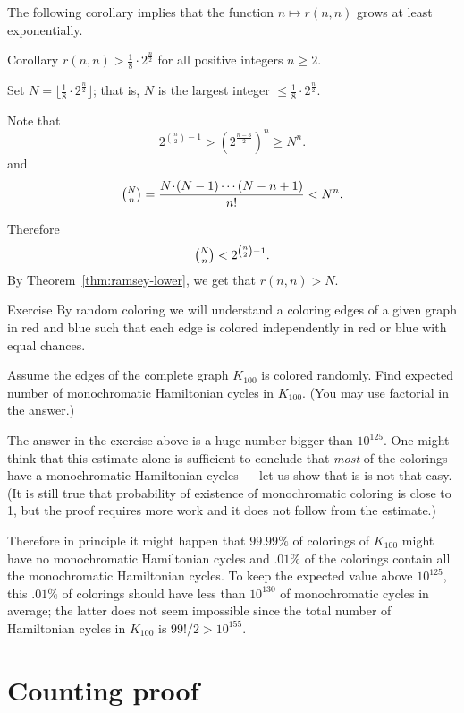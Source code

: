The following corollary implies that the function $n\mapsto r(n,n)$ grows at least exponentially. 

\begin{thm}{Corollary}
$r(n, n)> \tfrac1{8}\cdot 2^{\frac{n}{2}}$
for all positive integers $n\ge 2$.
\end{thm}

Set $N=\lfloor\tfrac1{8}\cdot 2^{\frac{n}{2}}\rfloor$;
that is, $N$ is the largest integer $\le\tfrac1{8}\cdot 2^{\frac{n}{2}}$.

Note that 
\[2^{\binom n 2 - 1}> (2^{\frac{n-3}2})^n\ge N^n.\]
and
\[\tbinom N n=\frac{N\cdot(N-1)\cdots (N-n+1)}{n!}<  N^n.\]

Therefore  
\[\tbinom N n<2^{\binom n 2 - 1}.\]
By Theorem~\ref{thm:ramsey-lower}, we get that $r(n,n)> N$.
\qeds

\begin{thm}{Exercise}
By random coloring we will understand a coloring edges of a given graph in red and blue such that each edge is colored independently in red or blue with equal chances. 

Assume the edges of the complete graph $K_{100}$ is colored randomly. 
Find expected number of monochromatic Hamiltonian cycles in $K_{100}$.
(You may use factorial in the answer.)
\end{thm} %

The answer in the exercise above is a huge number bigger than $10^{125}$.
One might think that this estimate alone is sufficient to conclude that {}\emph{most} of the colorings have a monochromatic Hamiltonian cycles --- let us show that is is not that easy.
(It is still true that probability of existence of monochromatic coloring is close to 1, but the proof requires more work and it does not follow from the estimate.)

Therefore in principle it might happen that $99.99\%$ of colorings of $K_{100}$ might have no monochromatic Hamiltonian cycles and $.01\%$ of the colorings contain all the monochromatic Hamiltonian cycles.
To keep the expected value above $10^{125}$,
this $.01\%$ of colorings should have less than $10^{130}$ of monochromatic cycles in average;
the latter does not seem impossible since the total number of Hamiltonian cycles in $K_{100}$ is $99!/2>10^{155}$.


\section*{Counting proof}


